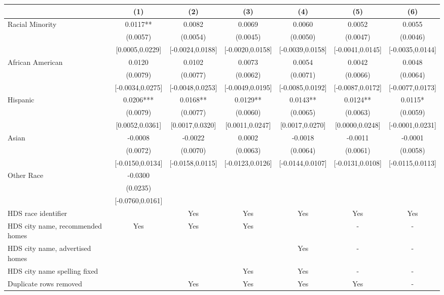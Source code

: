 \begin{table}[htbp]
{\begin{tabular}{l*{6}{c}}
                    \cmidrule(lr){2-2}\cmidrule(lr){3-3}\cmidrule(lr){4-4}\cmidrule(lr){5-5}\cmidrule(lr){6-6}\cmidrule(lr){7-7}
                    &\multicolumn{1}{c}{(1)}   &\multicolumn{1}{c}{(2)}   &\multicolumn{1}{c}{(3)}   &\multicolumn{1}{c}{(4)}   &\multicolumn{1}{c}{(5)}   &\multicolumn{1}{c}{(6)}\\
\midrule
Racial Minority & 0.0117** & 0.0082 & 0.0069 & 0.0060 & 0.0052 & 0.0055 \\
 & (0.0057) & (0.0054) & (0.0045) & (0.0050) & (0.0047) & (0.0046) \\
 & [0.0005,0.0229] & [-0.0024,0.0188] & [-0.0020,0.0158] & [-0.0039,0.0158] & [-0.0041,0.0145] & [-0.0035,0.0144] \\
\midrule
African American & 0.0120 & 0.0102 & 0.0073 & 0.0054 & 0.0042 & 0.0048 \\
 & (0.0079) & (0.0077) & (0.0062) & (0.0071) & (0.0066) & (0.0064) \\
 & [-0.0034,0.0275] & [-0.0048,0.0253] & [-0.0049,0.0195] & [-0.0085,0.0192] & [-0.0087,0.0172] & [-0.0077,0.0173] \\
Hispanic & 0.0206*** & 0.0168** & 0.0129** & 0.0143** & 0.0124** & 0.0115* \\
 & (0.0079) & (0.0077) & (0.0060) & (0.0065) & (0.0063) & (0.0059) \\
 & [0.0052,0.0361] & [0.0017,0.0320] & [0.0011,0.0247] & [0.0017,0.0270] & [0.0000,0.0248] & [-0.0001,0.0231] \\
Asian & -0.0008 & -0.0022 & 0.0002 & -0.0018 & -0.0011 & -0.0001 \\
 & (0.0072) & (0.0070) & (0.0063) & (0.0064) & (0.0061) & (0.0058) \\
 & [-0.0150,0.0134] & [-0.0158,0.0115] & [-0.0123,0.0126] & [-0.0144,0.0107] & [-0.0131,0.0108] & [-0.0115,0.0113] \\
Other Race & -0.0300 &  &  &  &  &  \\
 & (0.0235) &  &  &  &  &  \\
 & [-0.0760,0.0161] &  &  &  &  &  \\
\midrule
HDS race identifier & & Yes & Yes & Yes & Yes & Yes \\
HDS city name, recommended homes & Yes & Yes & Yes & & - & -\\
HDS city name, advertised homes &  &  &  & Yes & - & -\\
HDS city name spelling fixed & & & Yes & Yes & - & -\\
Duplicate rows removed &  & Yes & Yes & Yes & Yes & - \\

\end{tabular}}
\end{table}
